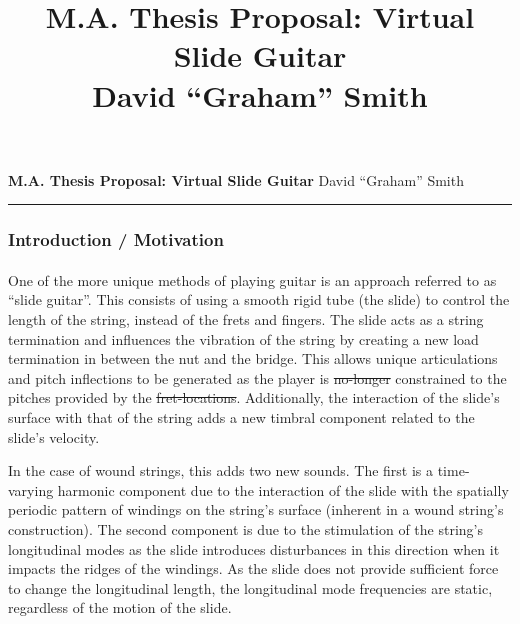 \documentclass[12pt]{article}
\title{M.A. Thesis Proposal: Virtual Slide Guitar \\David ``Graham'' Smith}
\providecommand{\DIFadd}[1]{{\protect\color{blue}\uwave{#1}}} %
\providecommand{\DIFdel}[1]{{\protect\color{red}\sout{#1}}}                      %
\providecommand{\DIFaddbegin}{} %
\providecommand{\DIFaddend}{} %
\providecommand{\DIFdelbegin}{} %
\providecommand{\DIFdelend}{} %
\begin{document}

\begin{flushleft}
    \large \textbf{M.A. Thesis Proposal: Virtual Slide Guitar}
    \hfill
    \normalsize David ``Graham'' Smith
\end{flushleft}
\hrule

\subsubsection*{Introduction / Motivation}
\paragraph{}
One of the more unique methods of playing guitar is an approach referred to as “slide guitar”. This consists of using a smooth rigid tube (the slide) to control the length of the string, instead of the frets and fingers. The slide acts as a string termination and influences the vibration of the string by creating a new load termination in between the nut and the bridge. This allows unique articulations and pitch inflections to be generated as the player is \DIFdelbegin \DIFdel{no-longer }\DIFdelend \DIFaddbegin \DIFadd{no longer }\DIFaddend constrained to the pitches provided by the \DIFdelbegin \DIFdel{fret-locations}\DIFdelend \DIFaddbegin \DIFadd{fret locations}\DIFaddend . Additionally, the interaction of the slide’s surface with that of the string adds a new timbral component related to the slide’s velocity.

In the case of wound strings, this adds two new sounds. The first is a time-varying harmonic component due to the interaction of the slide with the spatially periodic pattern of windings on the string’s surface (inherent in a wound string’s construction).  The second component is due to the stimulation of the string’s longitudinal modes as the slide introduces disturbances in this direction when it impacts the ridges of the windings. As the slide does not provide sufficient force to change the longitudinal length, the longitudinal mode frequencies are static, regardless of the motion of the slide.
\end{document}
